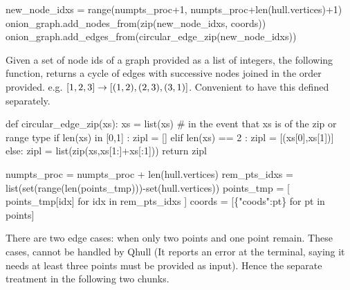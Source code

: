 \nwenddocs{}\endmoddef\nwstartdeflinemarkup{}\nwenddeflinemarkup
new_node_idxs   = range(numpts_proc+1, numpts_proc+len(hull.vertices)+1)
onion_graph.add_nodes_from(zip(new_node_idxs, coords))
onion_graph.add_edges_from(circular_edge_zip(new_node_idxs))
\nwendcode{}\nwdocspar


Given a set of node ids of a graph provided as a list of 
integers, the following function, returns a cycle of edges with successive nodes joined in
the order provided. e.g. $[1,2,3] \rightarrow [(1,2),(2,3),(3,1)]$. Convenient to have this defined 
separately. 

\nwenddocs{}\endmoddef\nwstartdeflinemarkup{}\nwenddeflinemarkup
def circular_edge_zip(xs):
    xs = list(xs) # in the event that xs is of the zip or range type 
    if len(xs) in [0,1] :
         zipl = []
    elif len(xs) == 2 :
         zipl = [(xs[0],xs[1])]
    else:
         zipl = list(zip(xs,xs[1:]+xs[:1]))
    return zipl

\nwendcode{}\nwdocspar




\nwenddocs{}\endmoddef\nwstartdeflinemarkup{}\nwenddeflinemarkup
numpts_proc  = numpts_proc + len(hull.vertices)
rem_pts_idxs = list(set(range(len(points_tmp)))-set(hull.vertices)) 
points_tmp   = [ points_tmp[idx] for idx in rem_pts_idxs ]
coords       = [\{"coods":pt\} for pt in points]
\nwendcode{}\nwdocspar


There are two edge cases: when only two points and one point remain. These cases, cannot be handled by Qhull (It reports an error at the terminal,
saying it needs at least three points must be provided as input). Hence the separate treatment in the following two chunks. 


